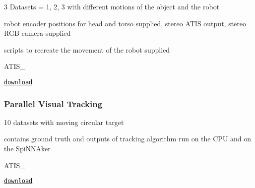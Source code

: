 \begin{DoxyItemize}
\item 3 Datasets = 1, 2, 3 with different motions of the object and the robot
\item robot encoder positions for head and torso supplied, stereo A\+T\+IS output, stereo R\+GB camera supplied
\item scripts to recreate the movement of the robot supplied
\item A\+T\+I\+S\+\_
\end{DoxyItemize}

\href{https://figshare.com/s/0abd8f18312bec15b121}{\tt download}

\subsubsection*{Parallel Visual Tracking}


\begin{DoxyItemize}
\item 10 datasets with moving circular target
\item contains ground truth and outputs of tracking algorithm run on the C\+PU and on the Spi\+N\+N\+Aker
\item A\+T\+I\+S\+\_
\end{DoxyItemize}

\href{https://doi.org/10.5281/zenodo.2556755}{\tt download} 